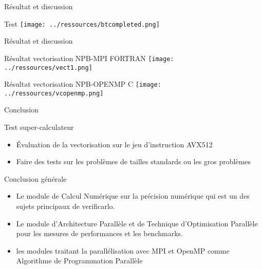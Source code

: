 \documentclass{beamer}
\begin{document}
\begin{frame}{Résultat et discussion}
    \begin{block}{Test}
      \texttt{[image: ../ressources/btcompleted.png]}
    \end{block}
\end{frame}

\begin{frame}{Résultat et discussion}
    \begin{block}{Résultat vectorisation NPB-MPI FORTRAN}
      \texttt{[image: ../ressources/vect1.png]}
    \end{block}
    
    \begin{block}{Résultat vectorisation NPB-OPENMP C}
      \texttt{[image: ../ressources/vcopenmp.png]}
    \end{block}
\end{frame}

\begin{frame}{ Conclusion}
    \begin{block}{Test super-calculateur}
      \begin{itemize}
          \item Évaluation de la vectorisation sur le jeu d'instruction AVX512
          \item Faire des tests sur les problèmes de tailles standards ou les gros problèmes
      \end{itemize}
    \end{block}
    
    \begin{block}{Conclusion générale}
    
        \begin{itemize}
            \item  Le module de Calcul Numérique sur la précision numérique qui est un des sujets principaux de verificarlo.
            \item Le module d’Architecture Parallèle et de Technique d’Optimisation Parallèle pour les mesures de performances et les benchmarks.
            \item  les modules traitant la parallélisation avec MPI et OpenMP comme Algorithme de Programmation Parallèle 
        \end{itemize}
     
    \end{block}
\end{frame}
\end{document}
